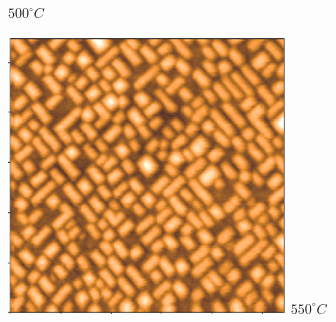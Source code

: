 \documentclass[10pt,pdf,hyperref={unicode}, dvipsnames]{beamer}
\begin{document}
\begin{frame}[t]
\begin{minipage}{0.32\linewidth}
		$500^{\circ}C$	
	\end{minipage}
	\begin{minipage}{0.32\linewidth}	
		\centering
		\includegraphics[width = \linewidth]{imgs/exp/550.png}
		$550^{\circ}C$	
	\end{minipage}
	\vspace{10pt}


\end{frame}
\end{document}
